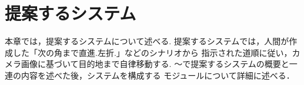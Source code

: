 \chapter{提案するシステム}
\label{chap:method}
本章では，提案するシステムについて述べる.
提案するシステムでは，人間が作成した「次の角まで直進.左折.」などのシナリオから
指示された道順に従い，カメラ画像に基づいて目的地まで自律移動する.
〜で提案するシステムの概要と一連の内容を述べた後，システムを構成する
モジュールについて詳細に述べる．
%
%
%







%
